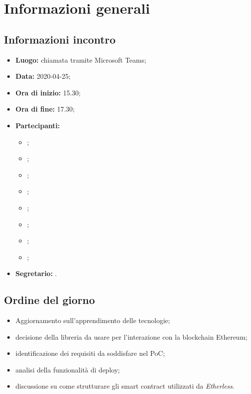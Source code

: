 \section{Informazioni generali}
\subsection{Informazioni incontro}
\begin{itemize}
	\item \textbf{Luogo:} chiamata tramite Microsoft Teams; 
	\item \textbf{Data:} 2020-04-25;
	\item \textbf{Ora di inizio:} 15.30; 
	\item \textbf{Ora di fine:} 17.30; 
	\item \textbf{Partecipanti:}
		\begin{itemize}
			\item \VB; 
			\item \LB; 
			\item \NF; 
			\item \EG; 
			\item \FJ; 
			\item \MP; 
			\item \AS; 
			\item \AZ; 
		\end{itemize}
	\item \textbf{Segretario:} \EG. 
\end{itemize}

\subsection{Ordine del giorno}
\begin{itemize}
	\item Aggiornamento sull'apprendimento delle tecnologie; 
	\item decisione della libreria da usare per l'interazione con la blockchain Ethereum; 
	\item identificazione dei requisiti da soddisfare nel PoC; 
	\item analisi della funzionalità di deploy;
	\item discussione su come strutturare gli smart contract utilizzati da \textit{Etherless}.
\end{itemize}
